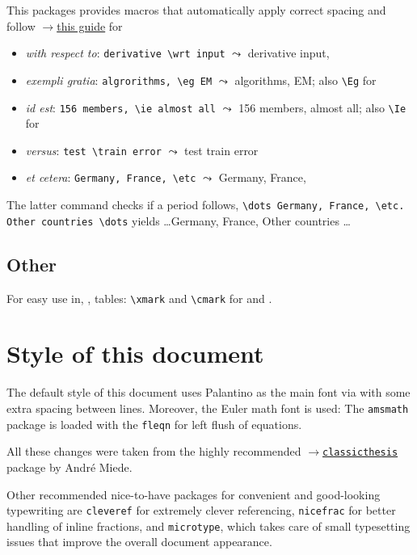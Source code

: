 \documentclass
[
]
{article}
\begin{document}
This packages provides macros that automatically apply correct spacing and follow \href{http://www.quickanddirtytips.com/education/grammar/ie-versus-eg?page=2}{$\rightarrow$this guide} for 
\begin{itemize}
	\item \emph{with respect to}: \texttt{derivative \textbackslash wrt input} $\leadsto$ derivative \wrt input,
	\item \emph{exempli gratia}: \texttt{algrorithms, \textbackslash eg EM} $\leadsto$ algorithms, \eg EM; also \texttt{\textbackslash Eg} for \Eg
	\item \emph{id est}: \texttt{156 members, \textbackslash ie almost all} $\leadsto$ 156 members, \ie almost all; also \texttt{\textbackslash Ie} for \Ie
	\item \emph{versus}: \texttt{test \textbackslash train error} $\leadsto$ test \vs train error
	\item \emph{et cetera}: \texttt{Germany, France, \textbackslash etc} $\leadsto$ Germany, France, \etc
\end{itemize}
The latter command checks if a period follows, \ie \texttt{\textbackslash dots Germany, France, \textbackslash etc. Other countries \textbackslash dots} yields \dots Germany, France, \etc Other countries \dots
\subsection{Other}
For easy use in, \eg, tables: \texttt{\textbackslash xmark} and \texttt{\textbackslash cmark} for \xmark and \cmark.

\section{Style of this document}
The default style of this document uses Palantino as the main font via 
with some extra spacing between lines. Moreover, the Euler math font is used:  The \texttt{amsmath} package is loaded with the \texttt{fleqn} for left flush of equations. 

All these changes were taken from the highly recommended \href{https://bitbucket.org/amiede/classicthesis/wiki/Home}{$\rightarrow$\texttt{classicthesis}} package by Andr\'e Miede.

Other recommended nice-to-have packages for convenient and good-looking typewriting are \texttt{cleveref} for extremely clever referencing, \texttt{nicefrac} for better handling of inline fractions, and \texttt{microtype}, which takes care of small typesetting issues that improve the overall document appearance.
\end{document}
